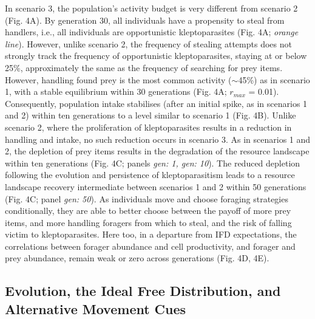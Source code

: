\documentclass[11pt]{article}
\begin{document}
In scenario 3, the population's activity budget is very different from scenario 2 (Fig. 4A).
By generation 30, all individuals have a propensity to steal from handlers, i.e., all individuals are opportunistic kleptoparasites (Fig. 4A; \textit{orange line}).
However, unlike scenario 2, the frequency of stealing attempts does not strongly track the frequency of opportunistic kleptoparasites, staying at or below 25\%, approximately the same as the frequency of searching for prey items.
However, handling found prey is the most common activity ($\sim$45\%) as in scenario 1, with a stable equilibrium within 30 generations (Fig. 4A; $r_{max}$ = 0.01).
Consequently, population intake stabilises (after an initial spike, as in scenarios 1 and 2) within ten generations to a level similar to scenario 1 (Fig. 4B).
Unlike scenario 2, where the proliferation of kleptoparasites results in a reduction in handling and intake, no such reduction occurs in scenario 3.
As in scenarios 1 and 2, the depletion of prey items results in the degradation of the resource landscape within ten generations (Fig. 4C; panels \textit{gen: 1, gen: 10}).
The reduced depletion following the evolution and persistence of kleptoparasitism leads to a resource landscape recovery intermediate between scenarios 1 and 2 within 50 generations (Fig. 4C; panel \textit{gen: 50}).
As individuals move and choose foraging strategies conditionally, they are able to better choose between the payoff of more prey items, and more handling foragers from which to steal, and the risk of falling victim to kleptoparasites.
Here too, in a departure from IFD expectations, the correlations between forager abundance and cell productivity, and forager and prey abundance, remain weak or zero across generations (Fig. 4D, 4E).

\subsection{Evolution, the Ideal Free Distribution, and Alternative Movement Cues}
\end{document}
